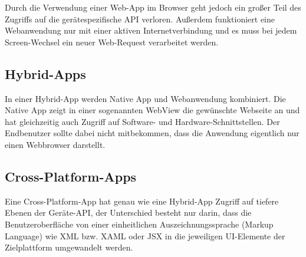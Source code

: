 Durch die Verwendung einer Web-App im Browser geht jedoch ein großer Teil des Zugriffs auf die
gerätespezifische API verloren. Außerdem funktioniert eine Webanwendung nur mit einer aktiven
Internetverbindung und es muss bei jedem Screen-Wechsel ein neuer Web-Request verarbeitet werden.

\subsection{Hybrid-Apps}
In einer Hybrid-App werden Native App und Webanwendung kombiniert. Die Native App zeigt in einer
sogenannten WebView die gewünschte Webseite an und hat gleichzeitig auch Zugriff auf Software- und
Hardware-Schnittstellen. Der Endbenutzer sollte dabei nicht mitbekommen, dass die Anwendung
eigentlich nur einen Webbrowser darstellt.

\subsection{Cross-Platform-Apps}
Eine Cross-Platform-App hat genau wie eine Hybrid-App Zugriff auf tiefere Ebenen der Geräte-API,
der Unterschied besteht nur darin, dass die Benutzeroberfläche von einer einheitlichen
Auszeichnungssprache (Markup Language) wie XML bzw. XAML oder JSX in die jeweiligen UI-Elemente der
Zielplattform umgewandelt werden.

\newpage

\newpage

\newpage

\newpage

\newpage